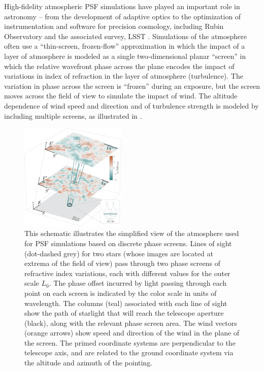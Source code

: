 \documentclass[twocolumn]{aastex631}
\begin{document}
High-fidelity atmospheric PSF simulations have played an important role in astronomy -- from the development of adaptive optics \citep{jolissaint_synthetic_2010, srinath_creating_2015, madurowicz_characterization_2018} to the optimization of instrumentation and software for precision cosmology, including Rubin Observatory and the associated survey, LSST  \citep{jee_toward_2011, chang_atmospheric_2012, peterson_simulation_2015, the_lsst_dark_energy_science_collaboration_lsst_2021}.
Simulations of the atmosphere often use a ``thin-screen, frozen-flow'' approximation in which the impact of a layer of atmosphere is modeled as a single two-dimensional planar ``screen'' in which the relative wavefront phase across the plane encodes the impact of variations in index of refraction in the layer of atmosphere (turbulence).  
The variation in phase across the screen is ``frozen'' during an exposure, but the screen moves across the field of view to simulate the impact of wind. 
The altitude dependence of wind speed and direction and of turbulence strength is modeled by including multiple screens, as illustrated in .

\begin{figure}
\includegraphics[width=0.45\textwidth]{f1_sim_schematic.png}
\caption{
    This schematic illustrates the simplified view of the atmosphere used for PSF simulations based on discrete phase screens. 
    Lines of sight (dot-dashed grey) for two stars (whose images are located at extrema of the field of view) pass through two phase screens of \vk refractive index variations, each with different values for the outer scale $L_0$. 
    The phase offset incurred by light passing through each point on each screen is indicated by the color scale in units of wavelength.
    The columns (teal) associated with each line of sight show the path of starlight that will reach the telescope aperture (black), along with the relevant phase screen area. 
    The wind vectors (orange arrows) show speed and direction of the wind in the plane of the screen.
    The primed coordinate systems are perpendicular to the telescope axis, and are related to the ground coordinate system via the altitude and azimuth of the pointing.
    \label{fig:schematic}
    }
\end{figure}
\end{document}
